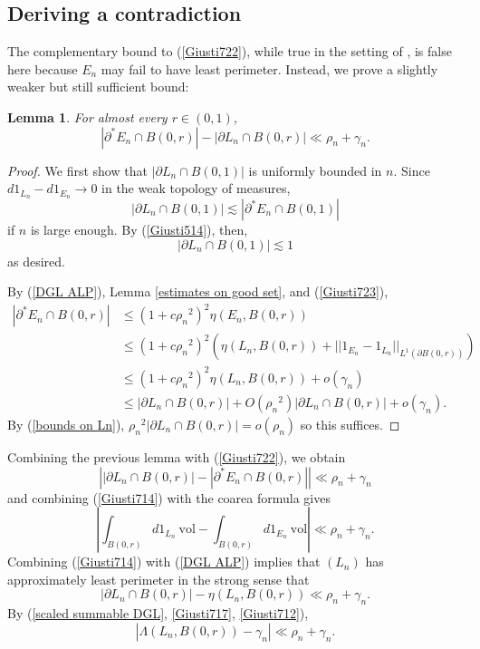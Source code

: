 \documentclass[reqno,12pt,letterpaper]{amsart}
\newcommand{\vol}{\mathrm{vol}}
\newtheorem{lemma}[theorem]{Lemma}
\theoremstyle{definition}
\numberwithin{equation}{section}
\begin{document}
\subsection{Deriving a contradiction}
The complementary bound to (\ref{Giusti722}), while true in the setting of \cite[Chapter 7]{Giusti77}, is false here because $E_n$ may fail to have least perimeter.
Instead, we prove a slightly weaker but still sufficient bound:

\begin{lemma}
For almost every $r \in (0, 1)$,
$$|\partial^* E_n \cap B(0, r)| - |\partial L_n \cap B(0, r)| \ll \rho_n + \gamma_n.$$
\end{lemma}
\begin{proof}
We first show that $|\partial L_n \cap B(0, 1)|$ is uniformly bounded in $n$.
Since $d1_{L_n} - d1_{E_n} \to 0$ in the weak topology of measures,
$$|\partial L_n \cap B(0, 1)| \lesssim |\partial^* E_n \cap B(0, 1)|$$
if $n$ is large enough.
By (\ref{Giusti514}), then,
\begin{equation}\label{bounds on Ln}
|\partial L_n \cap B(0, 1)| \lesssim 1
\end{equation}
as desired.

By (\ref{DGL ALP}), Lemma \ref{estimates on good set}, and (\ref{Giusti723}),
\begin{align*}
|\partial^* E_n \cap B(0, r)| &\leq (1 + c{\rho_n}^2)^2 \eta(E_n, B(0, r)) \\
&\leq (1 + c{\rho_n}^2)^2(\eta(L_n, B(0, r)) + ||1_{E_n} - 1_{L_n}||_{L^1(\partial B(0, r))})\\
&\leq (1 + c{\rho_n}^2)^2 \eta(L_n, B(0, r)) + o(\gamma_n)\\
&\leq |\partial L_n \cap B(0, r)| + O({\rho_n}^2) |\partial L_n \cap B(0, r)| + o(\gamma_n).
\end{align*}
By (\ref{bounds on Ln}), ${\rho_n}^2 |\partial L_n \cap B(0, r)| = o(\rho_n)$ so this suffices.
\end{proof}

Combining the previous lemma with (\ref{Giusti722}), we obtain
\begin{equation}\label{Giusti714}
\left||\partial L_n \cap B(0, r)| - |\partial^* E_n \cap B(0, r)|\right| \ll \rho_n + \gamma_n
\end{equation}
and combining (\ref{Giusti714}) with the coarea formula gives
\begin{equation}\label{Giusti713}
\left|\int_{B(0, r)} d1_{L_n} ~\vol - \int_{B(0, r)} d1_{E_n} ~\vol\right| \ll \rho_n + \gamma_n.
\end{equation}
Combining (\ref{Giusti714}) with (\ref{DGL ALP}) implies that $(L_n)$ has approximately least perimeter in the strong sense that
\begin{equation}\label{Giusti712}
|\partial L_n \cap B(0, r)| - \eta(L_n, B(0, r)) \ll \rho_n + \gamma_n.
\end{equation}
By (\ref{scaled summable DGL}, \ref{Giusti717}, \ref{Giusti712}),
\begin{equation}\label{bound the excess}
|\Lambda(L_n, B(0, r)) - \gamma_n| \ll \rho_n + \gamma_n.
\end{equation}
\end{document}
